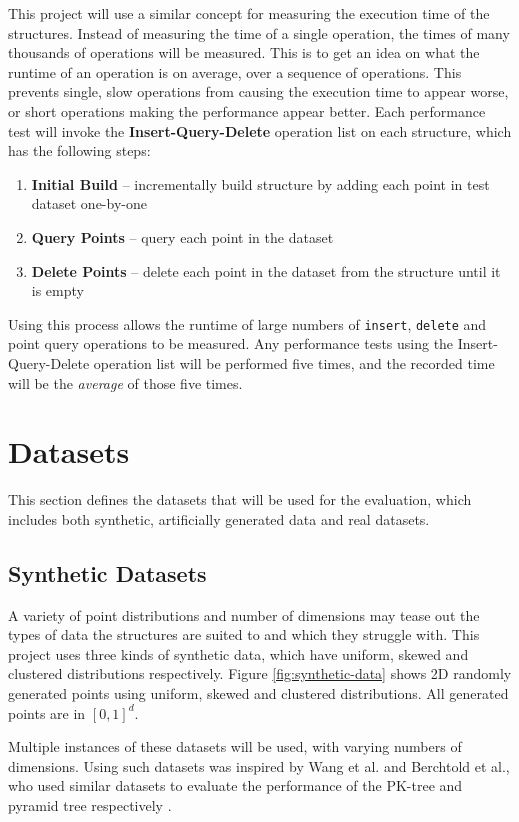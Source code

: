 This project will use a similar concept for measuring the execution time of the structures. Instead of measuring the time of a single operation, the times of many thousands of operations will be measured. This is to get an idea on what the runtime of an operation is on average, over a sequence of operations. This prevents single, slow operations from causing the execution time to appear worse, or short operations making the performance appear better. Each performance test will invoke the \textbf{Insert-Query-Delete} operation list on each structure, which has the following steps:
\begin{enumerate}
	\item \textbf{Initial Build} -- incrementally build structure by adding each point in test dataset one-by-one
	\item \textbf{Query Points} -- query each point in the dataset
	\item \textbf{Delete Points} -- delete each point in the dataset from the structure until it is empty
\end{enumerate}
Using this process allows the runtime of large numbers of \texttt{insert}, \texttt{delete} and point query operations to be measured. Any performance tests using the Insert-Query-Delete operation list will be performed five times, and the recorded time will be the \textit{average} of those five times.

\section{Datasets}
\label{sec:datasets}

This section defines the datasets that will be used for the evaluation, which includes both synthetic, artificially generated data and real datasets.

\subsection{Synthetic Datasets}

A variety of point distributions and number of dimensions may tease out the types of data the structures are suited to and which they struggle with. This project uses three kinds of synthetic data, which have uniform, skewed and clustered distributions respectively. Figure \ref{fig:synthetic-data} shows 2D randomly generated points using uniform, skewed and clustered distributions. All generated points are in $[0,1]^d$.

Multiple instances of these datasets will be used, with varying numbers of dimensions. Using such datasets was inspired by Wang et al. and Berchtold et al., who used similar datasets to evaluate the performance of the PK-tree and pyramid tree respectively \cite{pk-tree, pyramid-tree}.


